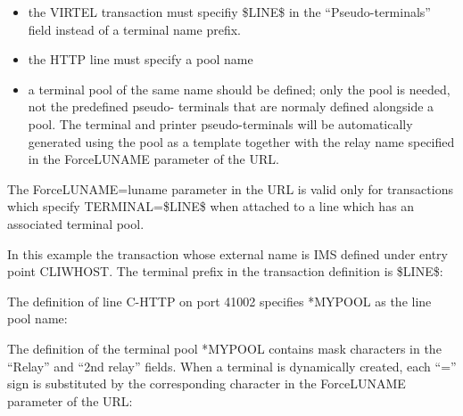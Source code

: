 \documentclass[letterpaper,10pt,english]{sphinxmanual}
\begin{document}
\begin{sphinxVerbatim}[commandchars=\\\{\}]
\end{sphinxVerbatim}
\begin{itemize}
\item {} 
the VIRTEL transaction must specifiy \$LINE\$ in the “Pseudo-terminals” field instead of a terminal name prefix.

\item {} 
the HTTP line must specify a pool name

\item {} 
a terminal pool of the same name should be defined; only the pool is needed, not the predefined pseudo- terminals that are normaly defined alongside a pool. The terminal and printer pseudo-terminals will be automatically generated using the pool as a template together with the relay name specified in the ForceLUNAME parameter of the URL.

\end{itemize}

The ForceLUNAME=luname parameter in the URL is valid only for transactions which specify TERMINAL=\$LINE\$ when attached to a line which has an associated terminal pool.

In this example the transaction whose external name is IMS defined under entry point CLIWHOST. The terminal prefix in the transaction definition is \$LINE\$:


The definition of line C-HTTP on port 41002 specifies *MYPOOL as the line pool name:


The definition of the terminal pool *MYPOOL contains mask characters in the “Relay” and “2nd relay” fields. When a terminal is dynamically created, each “=” sign is substituted by the corresponding character in the ForceLUNAME parameter of the URL:

\end{document}
